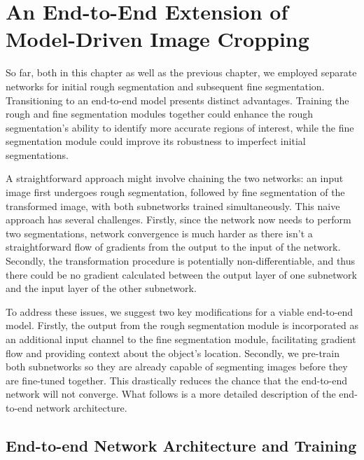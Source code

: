 \section{An End-to-End Extension of Model-Driven Image Cropping}

So far, both in this chapter as well as the previous chapter, we employed separate networks for initial rough segmentation and subsequent fine segmentation. Transitioning to an end-to-end model presents distinct advantages. Training the rough and fine segmentation modules together could enhance the rough segmentation's ability to identify more accurate regions of interest, while the fine segmentation module could improve its robustness to imperfect initial segmentations.

A straightforward approach might involve chaining the two networks: an input image first undergoes rough segmentation, followed by fine segmentation of the transformed image, with both subnetworks trained simultaneously. This naive approach has several challenges. Firstly, since the network now needs to perform two segmentations, network convergence is much harder as there isn't a straightforward flow of gradients from the output to the input of the network. Secondly, the transformation procedure is potentially non-differentiable, and thus there could be no gradient calculated between the output layer of one subnetwork and the input layer of the other subnetwork.

To address these issues, we suggest two key modifications for a viable end-to-end model. Firstly, the output from the rough segmentation module is incorporated as an additional input channel to the fine segmentation module, facilitating gradient flow and providing context about the object's location. Secondly, we pre-train both subnetworks so they are already capable of segmenting images before they are fine-tuned together. This drastically reduces the chance that the end-to-end network will not converge. What follows is a more detailed description of the end-to-end network architecture.

\subsection{End-to-end Network Architecture and Training}

